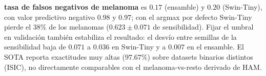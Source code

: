 \begin{table}[htbp]
\begin{minipage}{\textwidth}
  \textbf{tasa de falsos negativos de melanoma} es $0.17$ (ensamble) y $0.20$ (Swin-Tiny), con valor
  predictivo negativo $0.98$ y $0.97$; con el argmax por defecto Swin-Tiny pierde el $38\%$ de los melanomas
  ($0.623\pm0.071$ de sensibilidad). Fijar el umbral en validación también estabiliza el resultado: el desvío
  entre semillas de la sensibilidad baja de $0.071$ a $0.036$ en Swin-Tiny y a $0.007$ en el ensamble.
  El SOTA reporta exactitudes muy altas ($97.67\%$) sobre datasets
  binarios distintos (ISIC), no directamente comparables con el melanoma-vs-resto derivado de HAM.
\end{minipage}
\end{table}


